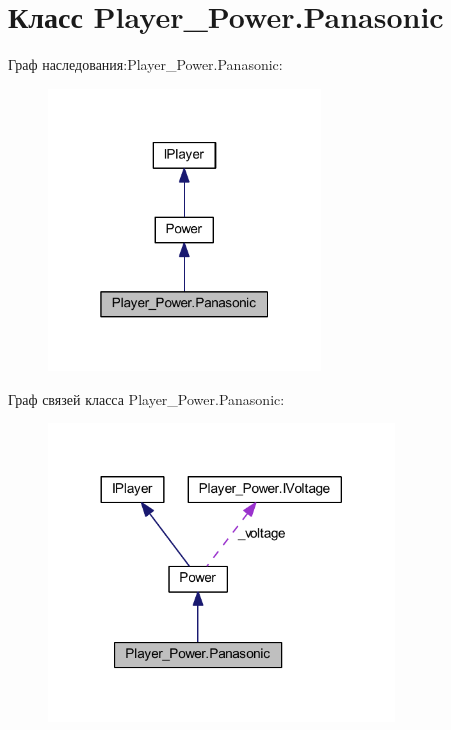 \section{Класс Player\-\_\-\-Power.\-Panasonic}
\label{class_player___power_1_1_panasonic}


Граф наследования\-:Player\-\_\-\-Power.\-Panasonic\-:
\nopagebreak
\begin{figure}[H]
\begin{center}
\leavevmode
\includegraphics[width=205pt]{class_player___power_1_1_panasonic__inherit__graph}
\end{center}
\end{figure}


Граф связей класса Player\-\_\-\-Power.\-Panasonic\-:
\nopagebreak
\begin{figure}[H]
\begin{center}
\leavevmode
\includegraphics[width=260pt]{class_player___power_1_1_panasonic__coll__graph}
\end{center}
\end{figure}
